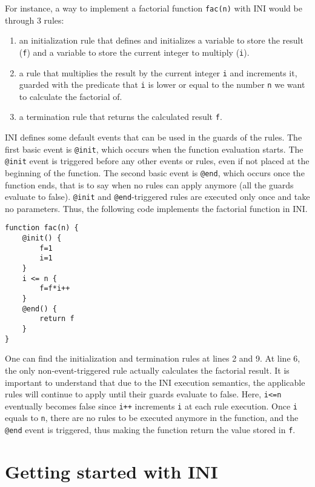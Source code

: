 \documentclass[11pt]{article}
\begin{document}
For instance, a way to implement a factorial function \texttt{fac(n)} with INI would be through 3 rules:

\begin{enumerate}
\item an initialization rule that defines and initializes a variable to store the result (\texttt{f}) and a variable to store the current integer to multiply (\texttt{i}).
\item a rule that multiplies the result by the current integer \texttt{i} and increments it, guarded with the predicate that \texttt{i} is lower or equal to the number \texttt{n} we want to calculate the factorial of.
\item a termination rule that returns the calculated result \texttt{f}.
\end{enumerate}

INI defines some default events that can be used in the guards of the rules. The first basic event is \texttt{@init}, which occurs when the function evaluation starts. The \texttt{@init} event is triggered before any other events or rules, even if not placed at the beginning of the function. The second basic event is \texttt{@end}, which occurs once the function ends, that is to say when no rules can apply anymore (all the guards evaluate to false). \texttt{@init} and \texttt{@end}-triggered rules are executed only once and take no parameters. Thus, the following code implements the factorial function in INI.

\begin{lstlisting}
function fac(n) {
	@init() {
		f=1
		i=1
	}
	i <= n {
		f=f*i++
	}
	@end() {
		return f
	}
}
\end{lstlisting}

One can find the initialization and termination rules at lines 2 and 9. At line 6, the only non-event-triggered rule actually calculates the factorial result. It is important to understand that due to the INI execution semantics, the applicable rules will continue to apply until their guards evaluate to false. Here, \texttt{i<=n} eventually becomes false since \texttt{i++} increments \texttt{i} at each rule execution. Once \texttt{i} equals to \texttt{n}, there are no rules to be executed anymore in the function, and the \texttt{@end} event is triggered, thus making the function return the value stored in \texttt{f}.

\section{Getting started with INI}
\end{document}
